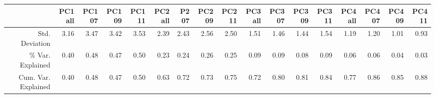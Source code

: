 \begin{table}[ht]
\centering
\begin{tabular}{rrrrrrrrrrrrrrrrr}
  \hline
 & PC1all & PC107 & PC109 & PC111 & PC2all & P207 & PC209 & PC211 & PC3all & PC307 & PC309 & PC311 & PC4all & PC407 & PC409 & PC411 \\ 
  \hline
Std. Deviation & 3.16 & 3.47 & 3.42 & 3.53 & 2.39 & 2.43 & 2.56 & 2.50 & 1.51 & 1.46 & 1.44 & 1.54 & 1.19 & 1.20 & 1.01 & 0.93 \\ 
  \% Var. Explained & 0.40 & 0.48 & 0.47 & 0.50 & 0.23 & 0.24 & 0.26 & 0.25 & 0.09 & 0.09 & 0.08 & 0.09 & 0.06 & 0.06 & 0.04 & 0.03 \\ 
  Cum. Var. Explained & 0.40 & 0.48 & 0.47 & 0.50 & 0.63 & 0.72 & 0.73 & 0.75 & 0.72 & 0.80 & 0.81 & 0.84 & 0.77 & 0.86 & 0.85 & 0.88 \\ 
   \hline
\end{tabular}
\end{table}
